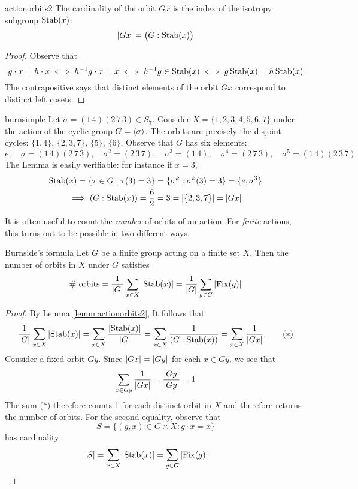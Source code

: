 \begin{lemm}{}{actionorbits2}
The cardinality of the orbit $Gx$ is the index of the isotropy subgroup $\operatorname{Stab}(x)$:
\[\left| Gx\right|=\bigl(G:\operatorname{Stab}(x)\bigr)\]
\end{lemm}


\begin{proof}
Observe that
\[g\cdot x=h\cdot x\iff h^{-1}g\cdot x=x\iff h^{-1}g\in \operatorname{Stab}(x)\iff g\operatorname{Stab}(x)=h\operatorname{Stab}(x)\]
The contrapositive says that distinct elements of the orbit $Gx$ correspond to distinct left cosets.
\end{proof}


\begin{example}{}{burnsimple}
 Let $\sigma=(1\,4)(2\,7\,3)\in S_7$. Consider $X=\{1,2,3,4,5,6,7\}$ under the action of the cyclic group $G=\left\langle \sigma\right\rangle$. The orbits are precisely the disjoint cycles: $\{1,4\}$, $\{2,3,7\}$, $\{5\}$, $\{6\}$. Observe that $G$ has six elements:
\[e,\quad \sigma=(1\,4)(2\,7\,3),\quad \sigma^2=(2\,3\,7),\quad \sigma^3=(1\,4),\quad \sigma^4=(2\,7\,3),\quad \sigma^5=(1\,4)(2\,3\,7)\]
The Lemma is easily verifiable: for instance if $x=3$,
\begin{gather*}
\operatorname{Stab}(x)=\{\tau\in G:\tau(3)=3\}=\{\sigma^k:\sigma^k(3)=3\}=\{e,\sigma^3\}\\
\implies (G:\operatorname{Stab}(x))=\frac 62=3=\left| \{2,3,7\}\right|=\left| Gx\right|
\end{gather*}
\end{example}


% 
It is often useful to count the \emph{number} of orbits of an action. For \emph{finite} actions, this turns out to be possible in two different ways.

\begin{thm}{Burnside's formula}{}
Let $G$ be a finite group acting on a finite set $X$. Then the number of orbits in $X$ under $G$ satisfies
\[\text{\# orbits}=\frac{1}{\left| G\right|}\sum_{x\in X}\left| \operatorname{Stab}(x)\right|=\frac{1}{\left| G\right|}\sum_{g\in G}\left| \operatorname{Fix}(g)\right|\]
\end{thm}

\begin{proof}
By Lemma \ref{lemm:actionorbits2},
It follows that
\[\frac 1{\left| G\right|}\sum_{x\in X}\left| \operatorname{Stab}(x)\right| =\sum_{x\in X}\frac{\left| \operatorname{Stab}(x)\right|}{\left| G\right|} =\sum_{x\in X}\frac 1{(G:\operatorname{Stab}(x))} =\sum_{x\in X}\frac{1}{\left| Gx\right|}.\tag*{($\ast$)}\]
Consider a fixed orbit $Gy$. Since $\left| Gx\right|=\left| Gy\right|$ for each $x\in Gy$, we see that
\[\sum_{x\in Gy}\frac{1}{\left| Gx\right|}=\frac{\left| Gy\right|}{\left| Gy\right|}=1\]
The sum ($\ast$) therefore counts 1 for each distinct orbit in $X$ and therefore returns the number of orbits.\smallbreak
For the second equality, observe that
\[S=\{(g,x)\in G\times X:g\cdot x=x\}\]
has cardinality
\[\left| S\right|=\sum\limits_{x\in X}\left| \operatorname{Stab}(x)\right|=\sum\limits_{g\in G}\left| \operatorname{Fix}(g)\right|\tag*{\qedhere}\]
\end{proof}



